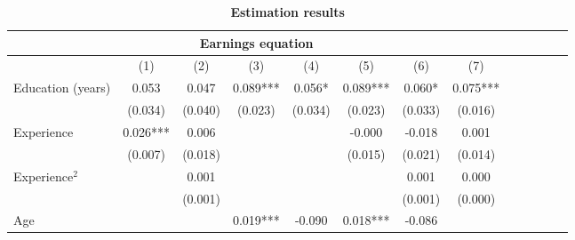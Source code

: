 \begin{center}
\begin{table}[th]
\caption{\textbf{Estimation results}} %
\label{tb:AllEstRes}
{\footnotesize 
\begin{tabular}{lcccccccccccc}
\hline
\hline


\multicolumn{8}{c}{\textbf{Earnings equation}}\\
\hline
\multicolumn{1}{c}{} &
  \multicolumn{1}{c}{(1)} &
  \multicolumn{1}{c}{(2)} &
  \multicolumn{1}{c}{(3)} &
  \multicolumn{1}{c}{(4)} &
  \multicolumn{1}{c}{(5)} &
  \multicolumn{1}{c}{(6)} &
  \multicolumn{1}{c}{(7)} \\
\cline{1-8}
\multicolumn{1}{l}{Education (years)} &
  \multicolumn{1}{c}{0.053} &
  \multicolumn{1}{c}{0.047} &
  \multicolumn{1}{c}{0.089***} &
  \multicolumn{1}{c}{0.056*} &
  \multicolumn{1}{c}{0.089***} &
  \multicolumn{1}{c}{0.060*} &
  \multicolumn{1}{c}{0.075***} \\
\multicolumn{1}{l}{} &
  \multicolumn{1}{c}{(0.034)} &
  \multicolumn{1}{c}{(0.040)} &
  \multicolumn{1}{c}{(0.023)} &
  \multicolumn{1}{c}{(0.034)} &
  \multicolumn{1}{c}{(0.023)} &
  \multicolumn{1}{c}{(0.033)} &
  \multicolumn{1}{c}{(0.016)} \\
\multicolumn{1}{l}{Experience} &
  \multicolumn{1}{c}{0.026***} &
  \multicolumn{1}{c}{0.006} &
  \multicolumn{1}{c}{} &
  \multicolumn{1}{c}{} &
  \multicolumn{1}{c}{-0.000} &
  \multicolumn{1}{c}{-0.018} &
  \multicolumn{1}{c}{0.001} \\
\multicolumn{1}{l}{} &
  \multicolumn{1}{c}{(0.007)} &
  \multicolumn{1}{c}{(0.018)} &
  \multicolumn{1}{c}{} &
  \multicolumn{1}{c}{} &
  \multicolumn{1}{c}{(0.015)} &
  \multicolumn{1}{c}{(0.021)} &
  \multicolumn{1}{c}{(0.014)} \\
\multicolumn{1}{l}{Experience$^2$} &
  \multicolumn{1}{c}{} &
  \multicolumn{1}{c}{0.001} &
  \multicolumn{1}{c}{} &
  \multicolumn{1}{c}{} &
  \multicolumn{1}{c}{} &
  \multicolumn{1}{c}{0.001} &
  \multicolumn{1}{c}{0.000} \\
\multicolumn{1}{l}{} &
  \multicolumn{1}{c}{} &
  \multicolumn{1}{c}{(0.001)} &
  \multicolumn{1}{c}{} &
  \multicolumn{1}{c}{} &
  \multicolumn{1}{c}{} &
  \multicolumn{1}{c}{(0.001)} &
  \multicolumn{1}{c}{(0.000)} \\
\multicolumn{1}{l}{Age} &
  \multicolumn{1}{c}{} &
  \multicolumn{1}{c}{} &
  \multicolumn{1}{c}{0.019***} &
  \multicolumn{1}{c}{-0.090} &
  \multicolumn{1}{c}{0.018***} &
  \multicolumn{1}{c}{-0.086} &

\end{tabular}}
\end{table}
\end{center}

